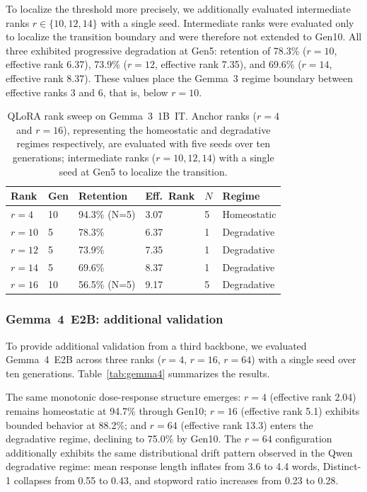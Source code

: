 \documentclass[a4paper,fleqn]{cas-dc}
\newif\ifshowchanges
\newcommand{\rev}[1]{\ifshowchanges{\color{blue}#1}\else{#1}\fi}
\begin{document}
To localize the threshold more precisely, we additionally evaluated intermediate
ranks $r \in \{10, 12, 14\}$ with a single seed. Intermediate ranks were
evaluated only to localize the transition boundary and were therefore not
extended to Gen10. All three exhibited progressive
degradation at Gen5: retention of 78.3\% ($r=10$, effective rank 6.37), 73.9\%
($r=12$, effective rank 7.35), and 69.6\% ($r=14$, effective rank 8.37). These
values place the Gemma~3 regime boundary between effective ranks 3 and 6, \rev{that is, below $r=10$}.

\begin{table}[width=.95\linewidth,cols=6,pos=htbp]
\caption{QLoRA rank sweep on Gemma~3~1B~IT. Anchor ranks ($r=4$ and $r=16$),
representing the homeostatic and degradative regimes respectively,
are evaluated with five seeds over ten generations; intermediate ranks
($r=10,12,14$) with a single seed at Gen5 to localize the transition.}\label{tab:gemma3}
\begin{tabular*}{\tblwidth}{@{} llllll@{} }
\toprule
Rank & Gen & Retention & Eff.\ Rank & \rev{$N$} & Regime \\
\midrule
$r=4$   & 10 & 94.3\% (N=5) & 3.07  & \rev{5} & Homeostatic \\
$r=10$  & 5  & 78.3\%       & 6.37  & \rev{1} & Degradative \\
$r=12$  & 5  & 73.9\%       & 7.35  & \rev{1} & Degradative \\
$r=14$  & 5  & 69.6\%       & 8.37  & \rev{1} & Degradative \\
$r=16$  & 10 & 56.5\% (N=5) & 9.17  & \rev{5} & Degradative \\
\bottomrule
\end{tabular*}
\end{table}

\subsubsection{Gemma~4~E2B: additional validation}

To provide additional validation from a third backbone, we evaluated
Gemma~4~E2B across three ranks ($r=4$, $r=16$, $r=64$) with a single seed
over ten generations. Table~\ref{tab:gemma4} summarizes the results.

The same monotonic dose-response structure emerges: $r=4$ (effective rank 2.04)
remains homeostatic at 94.7\% through Gen10; $r=16$ (effective rank 5.1)
exhibits bounded behavior at 88.2\%; and $r=64$ (effective rank 13.3)
enters the degradative regime, declining to 75.0\% by Gen10. The $r=64$
configuration additionally exhibits the same distributional drift pattern
observed in the Qwen degradative regime: mean response length inflates from
3.6 to 4.4 words, Distinct-1 collapses from 0.55 to 0.43, and stopword ratio
increases from 0.23 to 0.28.
\end{document}
